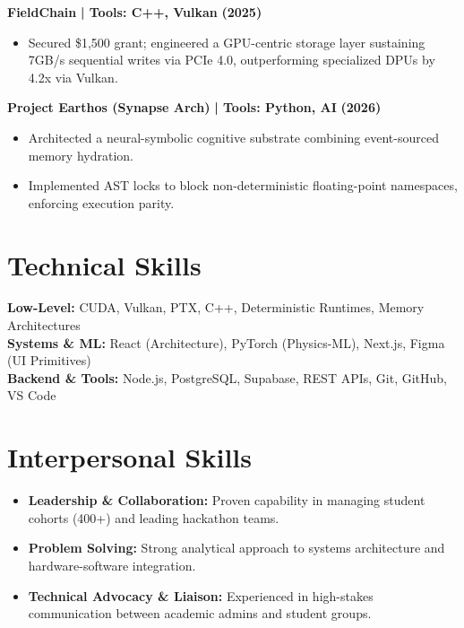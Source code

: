 \documentclass[9pt,a4paper]{extarticle}
\begin{document}
\textbf{FieldChain} {\color{primary}\textbf{| Tools: C++, Vulkan}} \hfill \textbf{(2025)}
\begin{itemize}
    \item Secured \$1,500 grant; engineered a GPU-centric storage layer sustaining 7GB/s sequential writes via PCIe 4.0, outperforming specialized DPUs by 4.2x via Vulkan.
\end{itemize}
\vspace{0.2mm}

\textbf{Project Earthos (Synapse Arch)} {\color{primary}\textbf{| Tools: Python, AI}} \hfill \textbf{(2026)}
\begin{itemize}
    \item Architected a neural-symbolic cognitive substrate combining event-sourced memory hydration.
    \item Implemented AST locks to block non-deterministic floating-point namespaces, enforcing execution parity.
\end{itemize}

\section{Technical Skills}
\textbf{Low-Level:} CUDA, Vulkan, PTX, C++, Deterministic Runtimes, Memory Architectures \\
\textbf{Systems \& ML:} React (Architecture), PyTorch (Physics-ML), Next.js, Figma (UI Primitives) \\
\textbf{Backend \& Tools:} Node.js, PostgreSQL, Supabase, REST APIs, Git, GitHub, VS Code

\section{Interpersonal Skills}
\begin{itemize}
    \item \textbf{Leadership \& Collaboration:} Proven capability in managing student cohorts (400+) and leading hackathon teams.
    \item \textbf{Problem Solving:} Strong analytical approach to systems architecture and hardware-software integration.
    \item \textbf{Technical Advocacy \& Liaison:} Experienced in high-stakes communication between academic admins and student groups.
\end{itemize}
\end{document}
